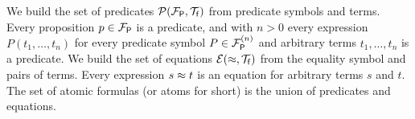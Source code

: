 
\begin{definition}\label{def:predicates}
	We build the set of {\myem predicates} ${{\mathcal P}({{\mathcal F}_{\mathsf P}},{\mathcal T}_{\mathsf f}})$
	from predicate symbols and terms. 
	Every proposition $p\in {{\mathcal F}_{\mathsf P}}$ is a predicate, 
	and with $n>0$ 
	every expression $P(t_1,\ldots,t_n)$
	for every predicate symbol $P\in{{\mathcal F}_{\mathsf P}^{(n)}}$ and arbitrary terms $t_1,\ldots,t_n$ is a predicate.
%	
	We build the set of {\myem equations }${{\mathcal E}(\approx, {\mathcal T}_{\mathsf f}})$ from the equality symbol and pairs of terms.
	Every expression $s\approx t$ is an equation for arbitrary terms $s$ and $t$.
%	
	The set of atomic formulas (or {\myem atoms }for short) is the union of predicates and equations.
\end{definition}